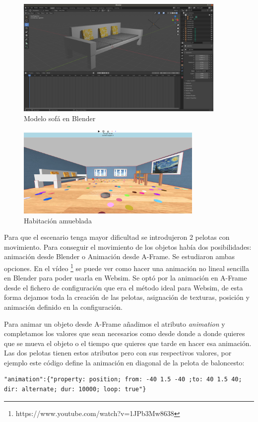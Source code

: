 \begin{figure}[H]
  \centering
 \includegraphics[width=0.9\textwidth, height=0.5\textwidth]{chapters/images/sofa.png}
  \caption{Modelo sofá en Blender}
\end{figure}



\begin{figure}[H]
\centering
\includegraphics[width=0.8\textwidth, height=0.4\textwidth]{chapters/images/habitacioncon.png}
\caption{Habitación amueblada}
\end{figure}

Para que el escenario tenga mayor dificultad se introdujeron 2 pelotas con movimiento. Para conseguir el movimiento de los objetos había dos posibilidades: animación desde Blender o Animación desde A-Frame. 
Se estudiaron ambas opciones. En el vídeo \footnote{https://www.youtube.com/watch?v=1JPb3Mw8638}  se puede ver como hacer una animación no lineal sencilla en Blender para poder usarla en Websim. Se optó por la animación en A-Frame desde el fichero de configuración que era el método ideal para Websim, de esta forma dejamos toda la creación de las pelotas, asignación de texturas, posición y  animación definido en la configuración.

Para animar un objeto desde A-Frame añadimos el atributo \textit{animation} y completamos los valores que sean necesarios como desde donde a donde quieres que se mueva  el objeto o el tiempo que quieres que tarde en hacer esa animación. Las dos pelotas tienen estos atributos pero con sus respectivos valores, por ejemplo este código define la animación en diagonal de la pelota de baloncesto: 
\begin{lstlisting}
"animation":{"property: position; from: -40 1.5 -40 ;to: 40 1.5 40; dir: alternate; dur: 10000; loop: true"}
\end{lstlisting}

